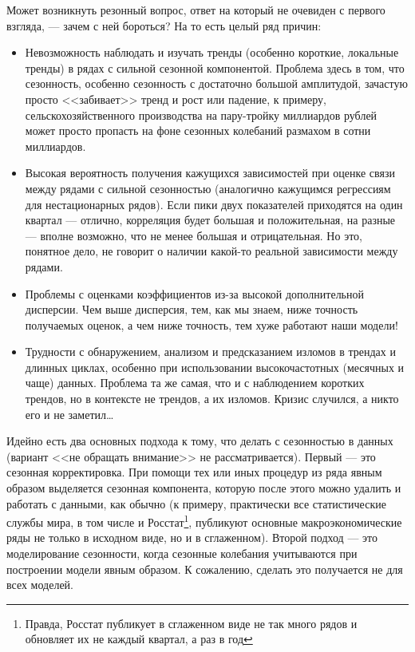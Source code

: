 \documentclass[final,pdftex]{../../template/epsilonj}\usepackage[]{graphicx}\usepackage[]{color}
\begin{document}
Может возникнуть резонный вопрос, ответ на который не очевиден с первого взгляда, --- зачем с ней бороться? На то есть целый ряд причин:

\begin{itemize}
\item Невозможность наблюдать и изучать тренды (особенно короткие, локальные тренды) в рядах с сильной сезонной компонентой. Проблема здесь в том, что сезонность, особенно сезонность с достаточно большой амплитудой, зачастую просто <<забивает>> тренд и рост или падение, к примеру, сельскохозяйственного производства на пару-тройку миллиардов рублей может просто пропасть на фоне сезонных колебаний размахом в сотни миллиардов. 
\item Высокая вероятность получения кажущихся зависимостей при оценке связи между рядами с сильной сезонностью (аналогично кажущимся регрессиям для нестационарных рядов). Если пики двух показателей приходятся на один квартал --- отлично, корреляция будет большая и положительная, на разные --- вполне возможно, что не менее большая и отрицательная. Но это, понятное дело, не говорит о наличии какой-то реальной зависимости между рядами. 
\item Проблемы с оценками коэффициентов из-за высокой дополнительной дисперсии. Чем выше дисперсия, тем, как мы знаем, ниже точность получаемых оценок, а чем ниже точность, тем хуже работают наши модели!
\item Трудности с обнаружением, анализом и предсказанием изломов в трендах и длинных циклах, особенно при использовании высокочастотных (месячных и чаще) данных. Проблема та же самая, что и с наблюдением коротких трендов, но в контексте не трендов, а их изломов. Кризис случился, а никто его и не заметил\ldots
\end{itemize}

Идейно есть два основных подхода к тому, что делать с сезонностью в данных (вариант <<не обращать внимание>> не рассматривается). Первый --- это сезонная корректировка. При помощи тех или иных процедур из ряда явным образом выделяется сезонная компонента, которую после этого можно удалить и работать с данными, как обычно (к примеру, практически все статистические службы мира, в том числе и Росстат\footnote{Правда, Росстат публикует в сглаженном виде не так много рядов и обновляет их не каждый квартал, а раз в год}, публикуют основные макроэкономические ряды не только в исходном виде, но и в сглаженном). Второй подход --- это моделирование сезонности, когда сезонные колебания учитываются при построении модели явным образом. К сожалению, сделать это получается не для всех моделей. 
\end{document}
